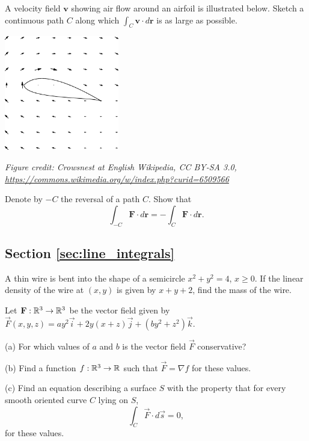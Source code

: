 \documentclass[svgnames]{watsonbook}
\begin{document}
\begin{exercise}{}{}
  A velocity field $\mathbf{v}$ showing air flow around an airfoil is
  illustrated below. Sketch a continuous path $C$ along which
  $\int_C \mathbf{v} \cdot d\mathbf{r}$ is as large as possible. 
  \begin{center}
    \includegraphics[width=5cm]{exercisefigures/airfoil}
  \end{center}
\textit{\tiny Figure credit: Crowsnest at English Wikipedia, CC BY-SA 3.0, \url{https://commons.wikimedia.org/w/index.php?curid=6509566}}
\end{exercise}

\begin{exercise}{}{}
  Denote by $-C$ the reversal of a path $C$. Show that 
  \[
  \int_{-C} \mathbf{F} \cdot d\mathbf{r} = -\int_{C}\mathbf{F}
  \cdot d\mathbf{r}. 
  \]
\end{exercise}

\subsection*{Section \ref{sec:line_integrals}}

\begin{exercise}{}{}
  A thin wire is bent into the shape of a semicircle $x^2 + y^2 = 4$,
  $x \geq 0$. If the linear density of the wire at $(x,y)$ is given by
  $x+y+2$, find the mass of the wire. 
\end{exercise}

\begin{exercise}{}{}
  Let $\mathbf{F}:\mathbb{R}^3 \to \mathbb{R}^3$ be the vector field given by
  $\vec{F}(x,y,z)=ay^2\vec{i}+2y(x+z)\vec{j}+(by^2 +z^2)\vec{k}$.

  (a) For which values of $a$ and $b$ is the vector field $\vec{F}$
  conservative?

  (b) Find a function $f:\mathbb{R}^3 \to \mathbb{R}$ such that $\vec{F} = \nabla f$
  for these values.

  (c) Find an equation describing a surface $S$ with the property that
  for every smooth oriented curve $C$ lying on $S$,
  \[
    \int_C \vec{F}\cdot d\vec{s} = 0,
  \]
  for these values.
\end{exercise}
\end{document}
